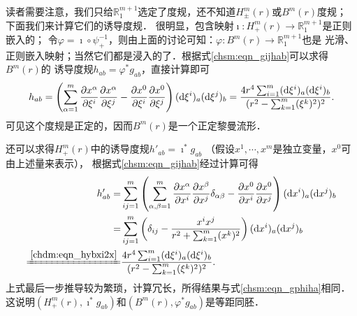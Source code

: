 读者需要注意，我们只给$\mathbb{R}^{m+1}_1$选定了度规，还不知道$H^m_{\pm}(r)$或$B^m(r)$度规；
下面我们来计算它们的诱导度规．
很明显，包含映射$\imath :H^m_{+}(r) \to \mathbb{R}^{m+1}_1$是正则嵌入的；
令$\varphi=\imath \circ \psi_{+}^{-1}$，则由上面的讨论可知：$\varphi:B^m(r)\to \mathbb{R}^{m+1}_1$也是
光滑、正则嵌入映射；当然它们都是浸入的了．根据式\eqref{chsm:eqn_gijhab}可以求得$B^m(r)$的
诱导度规$h_{ab}=\varphi^{*} g_{ab}$，直接计算即可
\setlength{\mathindent}{0em}
\begin{equation}\label{chsm:eqn_gphiha}
    h_{ab}= \left(\sum_{\alpha=1}^{m}\frac{\partial x^\alpha}{\partial \xi^i}
    \frac{\partial x^\alpha}{\partial \xi^j} -\frac{\partial x^0}{\partial \xi^i}
    \frac{\partial x^0}{\partial \xi^j} \right)
    ({\rm d}\xi^i)_a ({\rm d}\xi^j)_b
    = \frac{4r^4 \sum\nolimits_{i=1}^{m} ({\rm d}\xi^i)_a ({\rm d}\xi^i)_b} 
    {(r^2-\sum\nolimits_{k=1}^{m} (\xi^k)^2)^2}.
\end{equation}\setlength{\mathindent}{2em}
可见这个度规是正定的，因而$B^m(r)$是一个正定黎曼流形．

还可以求得$H^m_{+}(r)$中的诱导度规$h'_{ab}=\imath ^* g_{ab}$
（假设$x^1,\cdots,x^m$是独立变量，$x^0$可由上述量来表示），
根据式\eqref{chsm:eqn_gijhab}经过计算可得
\begin{equation}\label{chsm:eqn_gphihabb}
    \begin{aligned}
        h'_{ab}=& \sum_{ij=1}^{m}\left(\sum_{\alpha,\beta=1}^{m}\frac{\partial x^\alpha}{\partial x^i}
        \frac{\partial x^\beta}{\partial x^j}\delta_{\alpha\beta} -\frac{\partial x^0}{\partial x^i}
        \frac{\partial x^0}{\partial x^j} \right)    ({\rm d} x^i)_a ({\rm d} x^j)_b  \\
        =& \sum_{ij=1}^{m}\left(\delta_{ij}-\frac{x^i x^j}{r^2+\sum_{k=1}^{m}(x^k)^2}\right)({\rm d} x^i)_a ({\rm d} x^j)_b \\
        \xlongequal{\ref{chdm:eqn_hybxi2x}}&
        \frac{4r^4 \sum\nolimits_{i=1}^{m} ({\rm d}\xi^i)_a ({\rm d}\xi^i)_b} {(r^2-\sum\nolimits_{k=1}^{m} (\xi^k)^2)^2}.
    \end{aligned}
\end{equation}
上式最后一步推导较为繁琐，计算冗长，所得结果与式\eqref{chsm:eqn_gphiha}相同．
这说明$(H^m_{+}(r),\imath ^* g_{ab})$和$(B^m(r),\varphi ^* g_{ab})$是等距同胚．

